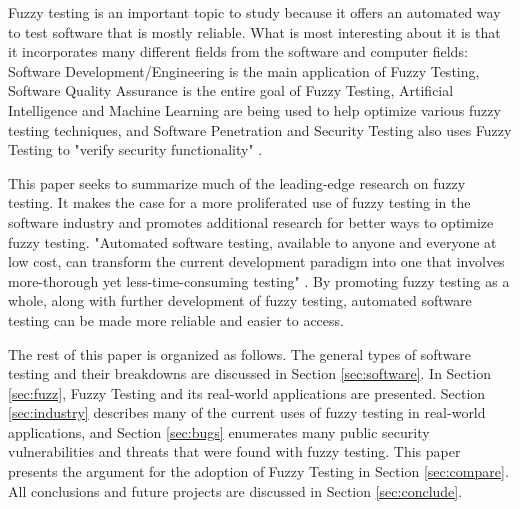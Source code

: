 \documentclass[10pt, final, journal, letterpaper, twoside, twocolumn]{IEEEtran}
\begin{document}
	Fuzzy testing is an important topic to study because it offers an automated way to test software that is mostly reliable. What is most interesting about it is that it incorporates many different fields from the software and computer fields: Software Development/Engineering is the main application of Fuzzy Testing, Software Quality Assurance is the entire goal of Fuzzy Testing, Artificial Intelligence and Machine Learning are being used to help optimize various fuzzy testing techniques, and Software Penetration and Security Testing also uses Fuzzy Testing to "verify security functionality" \cite{penetration}.
	
	This paper seeks to summarize much of the leading-edge research on fuzzy testing. It makes the case for a more proliferated use of fuzzy testing in the software industry and promotes additional research for better ways to optimize fuzzy testing. "Automated software testing, available to anyone and everyone at low cost, can transform the current development paradigm into one that involves more-thorough yet less-time-consuming testing" \cite{automation}. By promoting fuzzy testing as a whole, along with further development of fuzzy testing, automated software testing can be made more reliable and easier to access.
	
	The rest of this paper is organized as follows. The general types of software testing and their breakdowns are discussed in Section \ref{sec:software}. In Section \ref{sec:fuzz}, Fuzzy Testing and its real-world applications are presented. Section \ref{sec:industry} describes many of the current uses of fuzzy testing in real-world applications, and Section \ref{sec:bugs} enumerates many public security vulnerabilities and threats that were found with fuzzy testing. This paper presents the argument for the adoption of Fuzzy Testing in Section \ref{sec:compare}. All conclusions and future projects are discussed in Section \ref{sec:conclude}.
\end{document}
